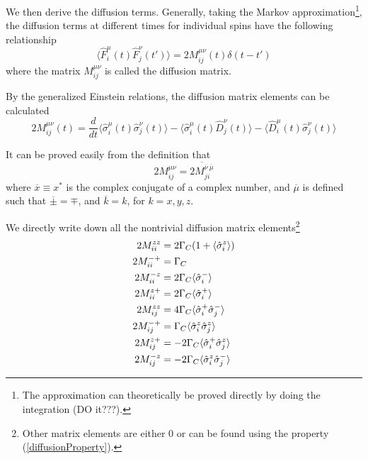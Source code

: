 \documentclass{article}
\newcommand{\gc}{\Gamma_C}
\begin{document}
We then derive the diffusion terms. Generally, taking the Markov approximation\footnote{The approximation can theoretically be proved directly by doing the integration (DO it???).}, the diffusion terms at different times for individual spins have the following relationship
\begin{equation}
\label{def:diffusionMatrix}
    \langle \hat{F}_i^\mu(t)\hat{F}_j^\nu(t')\rangle = 2M_{ij}^{\mu \nu}(t)\delta(t-t')
\end{equation}
where the matrix $M_{ij}^{\mu \nu}$ is called the diffusion matrix. 

By the generalized Einstein relations, the diffusion matrix elements can be calculated 
\begin{equation}
   \label{diffusionDef}
    2M_{ij}^{\mu \nu}(t) = \frac{d}{dt}\langle \hat{\sigma}_i^\mu(t)\hat{\sigma}_j^\nu(t)\rangle-\langle \hat{\sigma}_i^\mu(t)\hat{D}_j^\nu(t)\rangle-\langle \hat{D}_i^\mu(t)\hat{\sigma}_j^\nu(t)\rangle
\end{equation}

It can be proved easily from the definition that
\begin{equation}
\label{diffusionProperty}
    2M_{ij}^{\mu \nu} = \overline{2M_{ji}^{\overline{\nu}\ \overline{\mu}}}
\end{equation}
where $\overline x \equiv x^\ast$ is the complex conjugate of a complex number, and $\overline{\mu}$ is defined such that $\overline{\pm}=\mp$, and $\overline{k} = k$, for $k=x,y,z$.

We directly write down all the nontrivial diffusion matrix elements\footnote{Other matrix elements are either 0 or can be found using the property (\ref{diffusionProperty}).}
\begin{align}
\label{diffusion;+-}
    \notag 2M_{ii}^{zz} &= 2\gc(1+\langle \hat{\sigma}_i^z\rangle)\\
    \notag 2M_{ii}^{-+} &= \gc\\
    \notag 2M_{ii}^{-z} &= 2\gc\langle \hat{\sigma}_i^-\rangle\\
    \notag 2M_{ii}^{z+} &= 2\gc\langle \hat{\sigma}_i^+\rangle\\
    \notag 2M_{ij}^{zz} &= 4\gc\langle \hat{\sigma}_i^+\hat{\sigma}_j^-\rangle\\
           2M_{ij}^{-+} &=  \gc\langle \hat{\sigma}_i^z\hat{\sigma}_j^z\rangle\\
    \notag 2M_{ij}^{z+} &= -2\gc\langle \hat{\sigma}_i^+\hat{\sigma}_j^z\rangle\\
    \notag 2M_{ij}^{-z} &= -2\gc\langle \hat{\sigma}_i^z\hat{\sigma}_j^-\rangle
\end{align}
\end{document}
